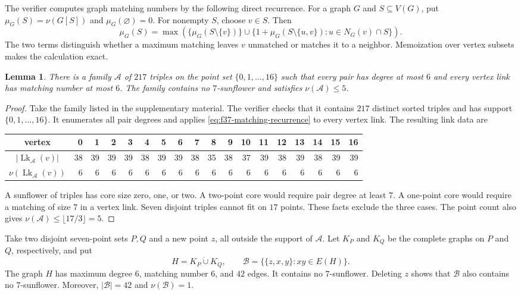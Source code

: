 \documentclass[11pt]{article}
\numberwithin{equation}{section}
\newtheorem{lemma}[lemma]{Lemma}
\theoremstyle{definition}
\theoremstyle{remark}
\newcommand{\A}{\mathcal A}
\newcommand{\B}{\mathcal B}
\newcommand{\Lk}{\operatorname{Lk}}
\newcommand{\dd}{\mathbin{\dot\cup}}
\begin{document}
The verifier computes graph matching numbers by the following direct
recurrence. For a graph $G$ and $S\subseteq V(G)$, put
$\mu_G(S)=\nu(G[S])$ and $\mu_G(\varnothing)=0$. For nonempty $S$, choose
$v\in S$. Then
\begin{equation}
 \mu_G(S)=\max\left(
 \{\mu_G(S\setminus\{v\})\}
 \mathbin{\cup}
 \bigl\{1+\mu_G(S\setminus\{u,v\}):u\in N_G(v)\cap S\bigr\}
 \right).
 \label{eq:f37-matching-recurrence}
\end{equation}
The two terms distinguish whether a maximum matching leaves $v$ unmatched or
matches it to a neighbor. Memoization over vertex subsets makes the
calculation exact.

\begin{lemma}
\label{lem:f37-base-family}
There is a family $\A$ of $217$ triples on the point set
$\{0,1,\ldots,16\}$ such that every pair has degree at most $6$ and every
vertex link has matching number at most $6$. The family contains no
$7$-sunflower and satisfies $\nu(\A)\le5$.
\end{lemma}

\begin{proof}
Take the family listed in the supplementary material. The verifier checks
that it contains $217$ distinct sorted triples and has support
$\{0,1,\ldots,16\}$. It enumerates all pair degrees and applies
\eqref{eq:f37-matching-recurrence} to every vertex link. The resulting link
data are
\begin{center}
\begingroup
\scriptsize
\setlength{\tabcolsep}{3.5pt}
\begin{tabular}{c|rrrrrrrrrrrrrrrrr}
\toprule
vertex &0&1&2&3&4&5&6&7&8&9&10&11&12&13&14&15&16\\
\midrule
$|\Lk_{\A}(v)|$&38&39&39&39&38&39&39&38&35&38&37&39&38&39&38&39&39\\
$\nu(\Lk_{\A}(v))$&6&6&6&6&6&6&6&6&6&6&6&6&6&6&6&6&6\\
\bottomrule
\end{tabular}
\endgroup
\end{center}

A sunflower of triples has core size zero, one, or two. A two-point core
would require pair degree at least $7$. A one-point core would require a
matching of size $7$ in a vertex link. Seven disjoint triples cannot fit on
$17$ points. These facts exclude the three cases. The point count also
gives $\nu(\A)\le\lfloor17/3\rfloor=5$.
\end{proof}

Take two disjoint seven-point sets $P,Q$ and a new point $z$, all outside the
support of $\A$. Let $K_P$ and $K_Q$ be the complete graphs on $P$ and $Q$,
respectively, and put
\[
 H=K_P\dd K_Q,
 \qquad
 \B=\bigl\{\{z,x,y\}:xy\in E(H)\bigr\}.
\]
The graph $H$ has maximum degree $6$, matching number $6$, and $42$ edges.
It contains no $7$-sunflower. Deleting $z$ shows that $\B$ also contains
no $7$-sunflower. Moreover, $|\B|=42$ and $\nu(\B)=1$.
\end{document}
